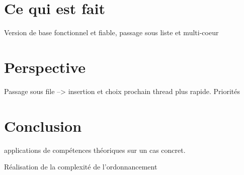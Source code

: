 \documentclass{article}
\begin{document}
	\section{Ce qui est fait}
	Version de base fonctionnel et fiable, passage sous liste et
    multi-coeur

	\section{Perspective}
	Passage sous file --> insertion et choix prochain thread plus
    rapide.  Priorités

	\section{Conclusion}
	applications de compétences théoriques sur un cas concret.
	
	Réalisation de la complexité de l'ordonnancement
\end{document}
